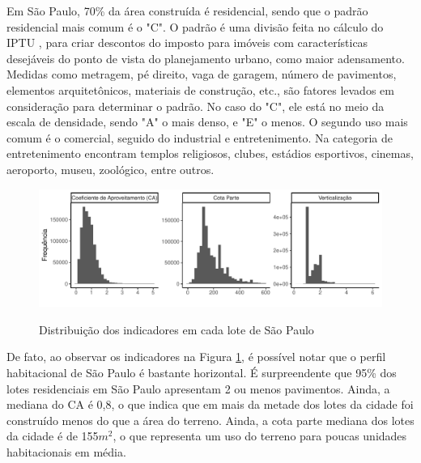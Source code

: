 Em São Paulo, 70\% da área construída é residencial, sendo que o padrão residencial mais comum é o "C". O padrão é uma divisão feita no cálculo do IPTU \cite{lei10235_1986}, para criar descontos do imposto para imóveis com características desejáveis do ponto de vista do planejamento urbano, como maior adensamento. Medidas como metragem, pé direito, vaga de garagem, número de pavimentos, elementos arquitetônicos, materiais de construção, etc., são fatores levados em consideração para determinar o padrão. No caso do "C", ele está no meio da escala de densidade, sendo "A" o mais denso, e "E" o menos. O segundo uso mais comum é o comercial, seguido do industrial e entretenimento. Na categoria de entretenimento encontram templos religiosos, clubes, estádios esportivos, cinemas, aeroporto, museu, zoológico, entre outros.

\begin{figure}[h]
    \centering
    \caption{Distribuição dos indicadores em cada lote de São Paulo}
    \includegraphics[width = \linewidth]{imagens/indicadores.pdf}
    \label{fig:histogramas}
\end{figure}

De fato, ao observar os indicadores na Figura \ref{fig:histogramas}, é possível notar que o perfil habitacional de São Paulo é bastante horizontal. É surpreendente que 95\% dos lotes residenciais em São Paulo apresentam 2 ou menos pavimentos. Ainda, a mediana do CA é 0,8, o que indica que em mais da metade dos lotes da cidade foi construído menos do que a área do terreno. Ainda, a cota parte mediana dos lotes da cidade é de 155$m^2$, o que representa um uso do terreno para poucas unidades habitacionais em média. 

